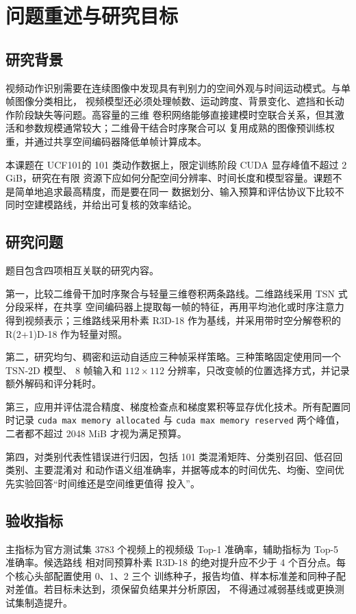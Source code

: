 \section{问题重述与研究目标}

\subsection{研究背景}

视频动作识别需要在连续图像中发现具有判别力的空间外观与时间运动模式。与单帧图像分类相比，
视频模型还必须处理帧数、运动跨度、背景变化、遮挡和长动作阶段缺失等问题。高容量的三维
卷积网络能够直接建模时空联合关系，但其激活和参数规模通常较大；二维骨干结合时序聚合可以
复用成熟的图像预训练权重，并通过共享空间编码器降低单帧计算成本。

本课题在 UCF101\cite{ucf101}的 101 类动作数据上，限定训练阶段 CUDA 显存峰值不超过 2 GiB，研究在有限
资源下应如何分配空间分辨率、时间长度和模型容量。课题不是简单地追求最高精度，而是要在同一
数据划分、输入预算和评估协议下比较不同时空建模路线，并给出可复核的效率结论。

\subsection{研究问题}

题目包含四项相互关联的研究内容。

第一，比较二维骨干加时序聚合与轻量三维卷积两条路线。二维路线采用 TSN 式分段采样\cite{tsn}，在共享
空间编码器上提取每一帧的特征，再用平均池化或时序注意力得到视频表示；三维路线采用朴素
R3D-18 作为基线\cite{i3d}，并采用带时空分解卷积的 R(2+1)D-18 作为轻量对照\cite{r21d}。

第二，研究均匀、稠密和运动自适应三种帧采样策略。三种策略固定使用同一个 TSN-2D 模型、
8 帧输入和 $112\times112$ 分辨率，只改变帧的位置选择方式，并记录额外解码和评分耗时。

第三，应用并评估混合精度、梯度检查点和梯度累积等显存优化技术。所有配置同时记录
\texttt{cuda max memory allocated} 与 \texttt{cuda max memory reserved} 两个峰值，
二者都不超过 2048 MiB 才视为满足预算。

第四，对类别代表性错误进行归因，包括 101 类混淆矩阵、分类别召回、低召回类别、主要混淆对
和动作语义组准确率，并据等成本的时间优先、均衡、空间优先实验回答“时间维还是空间维更值得
投入”。

\subsection{验收指标}

主指标为官方测试集 3783 个视频上的视频级 Top-1 准确率，辅助指标为 Top-5 准确率。候选路线
相对同预算朴素 R3D-18 的绝对提升应不少于 4 个百分点。每个核心头部配置使用 0、1、2 三个
训练种子，报告均值、样本标准差和同种子配对差值。若目标未达到，须保留负结果并分析原因，
不得通过减弱基线或更换测试集制造提升。
